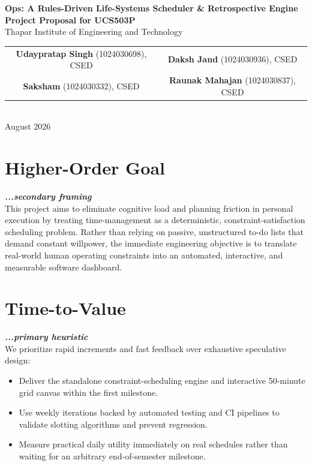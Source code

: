 \documentclass[11pt,a4paper]{article}
\begin{document}
\begin{center}
    {\LARGE \textbf{Ops: A Rules-Driven Life-Systems Scheduler \& Retrospective Engine}}\\[0.5em]
    {\large \textbf{Project Proposal for UCS503P}}\\[0.6em]
    {\normalsize Thapar Institute of Engineering and Technology}\\[0.8em]
    
    \begin{tabular}{cc}
        \textbf{Udaypratap Singh} (1024030698), CSED & \textbf{Daksh Jand} (1024030936), CSED \\[0.3em]
        \textbf{Saksham} (1024030332), CSED & \textbf{Raunak Mahajan} (1024030837), CSED
    \end{tabular}\\[0.8em]
    
    {\small August 2026}
\end{center}

\vspace{0.6em}

\section{Higher-Order Goal}
\textbf{\textit{...secondary framing}} \\
This project aims to eliminate cognitive load and planning friction in personal execution by treating time-management as a deterministic, constraint-satisfaction scheduling problem. Rather than relying on passive, unstructured to-do lists that demand constant willpower, the immediate engineering objective is to translate real-world human operating constraints into an automated, interactive, and measurable software dashboard.

\section{Time-to-Value}
\textbf{\textit{...primary heuristic}} \\
We prioritize rapid increments and fast feedback over exhaustive speculative design:
\begin{itemize}
    \item Deliver the standalone constraint-scheduling engine and interactive 50-minute grid canvas within the first milestone.
    \item Use weekly iterations backed by automated testing and CI pipelines to validate slotting algorithms and prevent regression.
    \item Measure practical daily utility immediately on real schedules rather than waiting for an arbitrary end-of-semester milestone.
\end{itemize}
\end{document}
